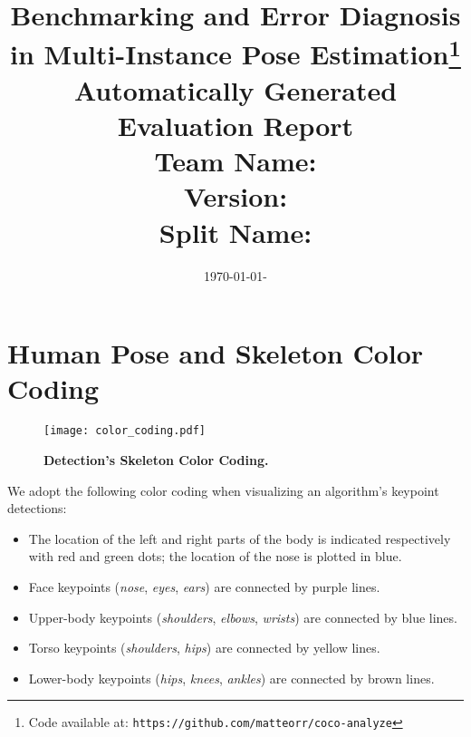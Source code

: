 \documentclass[10pt,onecolumn,letterpaper]{article}
\begin{document}
\title{Benchmarking and Error Diagnosis in Multi-Instance Pose Estimation\footnote{Code available at: \texttt{https://github.com/matteorr/coco-analyze}}\\
Automatically Generated Evaluation Report\\[1.5ex]
\textbf{Team Name:}  \texttt{}\\[1.5ex]
\textbf{Version:}    \texttt{}\\[1.5ex]
\textbf{Split Name:} \texttt{}}
\date{\today - \currenttime}
\maketitle


\section{Human Pose and Skeleton Color Coding}
\begin{wrapfigure}{l}{0.5\textwidth}
\texttt{[image: color\_coding.pdf]}
\caption{ {\small \textbf{Detection's Skeleton Color Coding.}}}
\end{wrapfigure}
We adopt the following color coding when visualizing an algorithm's keypoint detections:
\begin{itemize}
    \item The location of the left and right parts of the body is indicated respectively with red and green dots; the location of the nose is plotted in blue.%
    \item Face keypoints (\textit{nose}, \textit{eyes}, \textit{ears}) are connected by purple lines.
    \item Upper-body keypoints (\textit{shoulders}, \textit{elbows}, \textit{wrists}) are connected by blue lines.
    \item Torso keypoints (\textit{shoulders}, \textit{hips}) are connected by yellow lines.
    \item Lower-body keypoints (\textit{hips}, \textit{knees}, \textit{ankles}) are connected by brown lines.
\end{itemize}
\clearpage

\end{document}
